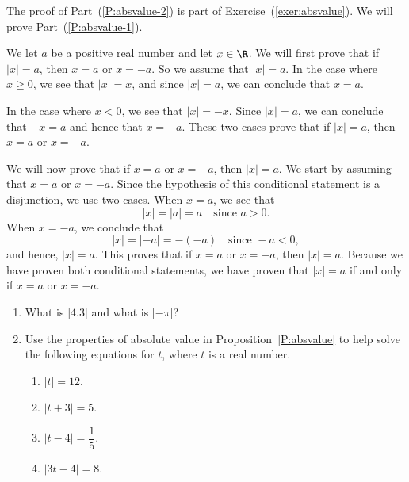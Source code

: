 \begin{myproof}
The proof of Part~(\ref{P:absvalue-2}) is part of Exercise~(\ref{exer:absvalue}).  We will prove 
Part~(\ref{P:absvalue-1}).

We let $a$ be a positive real number and let $x \in \R$.  We will first prove that if $|x| = a$, then $x = a$ or $x = -a$.  So we assume that 
$\left| x \right| = a$.  In the case where $x \geq 0$, we see that $\left| x \right| = x$, and since $\left| x \right| = a$, we can conclude that $x = a$.

In the case where $x < 0$, we see that $\left| x \right| = -x$.  Since 
$\left| x \right| = a$, we can conclude that $-x = a$ and hence that $x = -a$.  These two cases prove that if $\left| x \right| = a$, then $x = a$ or $x = -a$.

We will now prove that if $x = a$ or $x = -a$, then $|x| = a$.  We start by assuming that $x = a$ or 
$x = -a$.  Since the hypothesis of this conditional statement is a disjunction, we use two cases.  When 
$x = a$, we see that 
\[
\left| x \right| = \left| a \right| = a \quad \text{since } a > 0.
\]
When $x = -a$, we conclude that 
\[
\left| x \right| = \left| -a \right| = - \left( -a  \right) \quad \text{since } -a < 0,
\]
and hence, $\left| x \right| = a$.  This proves that if $x = a$ or $x = -a$, then 
$\left| x \right| = a$. Because we have proven both conditional statements, we have proven that $\left| x \right| = a$ if and only if $x = a$ or $x = -a$.
\end{myproof}
\hbreak

\begin{prog}\label{pr:absvalue} \hfill  
\begin{enumerate}
\item What is $\left| 4.3 \right|$ and what is $\left| - \pi \right|$?

\item Use the properties of absolute value in Proposition~\ref{P:absvalue} to help solve the following equations for $t$, where $t$ is a real number.

\begin{multicols}{2}
\begin{enumerate}
\item $\left| t  \right| = 12$.
\item $\left| t + 3 \right| = 5$.
\item $\left| t -4 \right| = \dfrac{1}{5}$.
\item $\left| 3t - 4 \right| = 8$.
\end{enumerate}
\end{multicols}
\end{enumerate}
\end{prog}
\hbreak

